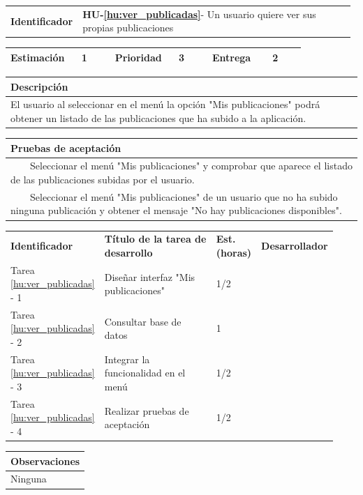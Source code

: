 \documentclass[11pt]{article}
\newcommand{\tabitem}{~~\llap{\textbullet}~~}
\begin{document}
\begin{longtable}{p{0.18\linewidth}|p{0.8\linewidth}}
  \rowcolor{LightCyan}
  \textbf{Identificador} & \textbf{HU-\ref{hu:ver_publicadas}}- Un usuario quiere ver sus propias publicaciones \\  
\end{longtable}
\vspace{-0.8cm}
\begin{longtable}{p{0.18\linewidth}|p{0.1\linewidth}|p{0.18\linewidth}|p{0.1\linewidth}|p{0.18\linewidth}|p{0.1\linewidth}}
  \toprule
  \textbf{Estimación} & 1 & \textbf{Prioridad} & 3 & \textbf{Entrega} & 2 \\
  \bottomrule
\end{longtable}
\vspace{-0.8cm}
\begin{longtable}{p{1.028\linewidth}}
  \textbf{Descripción}\\
  \midrule
 El usuario al seleccionar en el menú la opción "Mis publicaciones" podrá obtener un listado de las publicaciones que ha subido a la aplicación. \\
  \bottomrule
\end{longtable}
\vspace{-0.8cm}
\begin{longtable}{p{1.028\linewidth}}
  \textbf{Pruebas de aceptación}\\
  \midrule
  \tabitem Seleccionar el menú "Mis publicaciones" y comprobar que aparece el listado de las publicaciones subidas por el usuario.\\
  \tabitem Seleccionar el menú "Mis publicaciones" de un usuario que no ha subido ninguna publicación y obtener el mensaje "No hay publicaciones disponibles".\\
\end{longtable}
\vspace{-0.8cm}
\begin{longtable}{p{0.18\linewidth}|p{0.48\linewidth}|p{0.1\linewidth}|p{0.17\linewidth}}
  \toprule
  \textbf{Identificador} & \textbf{Título de la tarea de desarrollo} & \textbf{Est. (horas)} & \textbf{Desarrollador} \\
  Tarea \ref{hu:ver_publicadas} - 1 & Diseñar interfaz "Mis publicaciones" & 1/2 &\\
  Tarea \ref{hu:ver_publicadas} - 2 & Consultar base de datos & 1 & \\
  Tarea \ref{hu:ver_publicadas} - 3 & Integrar la funcionalidad en el menú & 1/2 & \\
  Tarea \ref{hu:ver_publicadas} - 4 & Realizar pruebas de aceptación & 1/2 &  \\
  \bottomrule
\end{longtable}
\vspace{-0.8cm}
\begin{longtable}{p{1.028\linewidth}}
  \textbf{Observaciones}\\
  \midrule
  Ninguna\\
  \bottomrule
\end{longtable}
\end{document}
